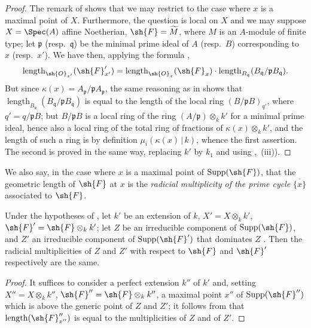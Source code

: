 \begin{proof}
The remark of  shows that we may restrict to the case where $x$ is a maximal point of $X$.
Furthermore, the question is local on $X$ and we may suppose $X=\Spec(A)$ affine Noetherian, $\sh{F}=\widetilde{M}$, where $M$ is an $A$-module of finite type; let $\mathfrak{p}$ (resp.\ $\mathfrak{q}$) be the minimal prime ideal of $A$ (resp.\ $B$) corresponding to $x$ (resp.\ $x'$).
We have then, applying the formula ,
\[
  \operatorname{length}_{\sh{O}_{x'}}(\sh{F}'_{x'}) = \operatorname{length}_{\sh{O}_x}(\sh{F}_x)\cdot\operatorname{length}_{B_\mathfrak{q}}(B_\mathfrak{q}/\mathfrak{p}B_\mathfrak{q}).
\]
But since $\kappa(x) = A_\mathfrak{p}/\mathfrak{p}A_\mathfrak{p}$, the same reasoning as in  shows that $\operatorname{length}_{B_\mathfrak{q}}(B_\mathfrak{q}/\mathfrak{p}B_\mathfrak{q})$ is equal to the length of the local ring $(B/\mathfrak{p}B)_{q'}$, where $q'=q/\mathfrak{p}B$; but $B/\mathfrak{p}B$ is a local ring of the ring $(A/\mathfrak{p})\otimes_k k'$ for a minimal prime ideal, hence also a local ring of the total ring of fractions of $\kappa(x)\otimes_k k'$, and the length of such a ring is by definition $\mu_i(\kappa(x)\,|\,k)$, whence the first assertion.
The second is proved in the same way, replacing $k'$ by $k_1$ and using ,~(iii)).
\end{proof}

We also say, in the case where $x$ is a maximal point of $\operatorname{Supp}(\sh{F})$, that the geometric length of $\sh{F}$ at $x$ is the \emph{radicial multiplicity of the prime cycle} $\overline{\{x\}}$ associated to $\sh{F}$.

\begin{corollary}[4.7.9]
\label{IV.4.7.9}
Under the hypotheses of , let $k'$ be an extension of $k$, $X'=X\otimes_k k'$, $\sh{F}'=\sh{F}\otimes_k k'$; let $Z$ be an irreducible component of $\operatorname{Supp}(\sh{F})$, and $Z'$ an irreducible component of $\operatorname{Supp}(\sh{F}')$ that dominates $Z$ .
Then the radicial multiplicities of $Z$ and $Z'$ with respect to $\sh{F}$ and $\sh{F}'$ respectively are the same.
\end{corollary}

\begin{proof}
It suffices to consider a perfect extension $k''$ of $k'$ and, setting $X''=X\otimes_k k''$, $\sh{F}''=\sh{F}\otimes_k k''$, a maximal point $x''$ of $\operatorname{Supp}(\sh{F}'')$ which is above the generic point of $Z$ and $Z'$; it follows from  that $\operatorname{length}(\sh{F}''_{x''})$ is equal to the multiplicities of $Z$ and of $Z'$.
\end{proof}

